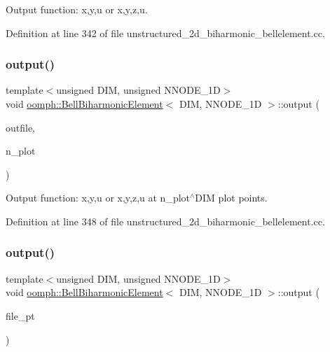 Output function\+: x,y,u or x,y,z,u. 



Definition at line 342 of file unstructured\+\_\+2d\+\_\+biharmonic\+\_\+bellelement.\+cc.

\mbox{\label{classoomph_1_1BellBiharmonicElement_a558bc65d41a06e864e62eba4d3aa4fa5}} 
\subsubsection{\texorpdfstring{output()}{output()}\hspace{0.1cm}{\footnotesize\ttfamily [2/4]}}
{\footnotesize\ttfamily template$<$unsigned D\+IM, unsigned N\+N\+O\+D\+E\+\_\+1D$>$ \\
void \hyperlink{classoomph_1_1BellBiharmonicElement}{oomph\+::\+Bell\+Biharmonic\+Element}$<$ D\+IM, N\+N\+O\+D\+E\+\_\+1D $>$\+::output (\begin{DoxyParamCaption}\item[{std\+::ostream \&}]{outfile,  }\item[{const unsigned \&}]{n\+\_\+plot }\end{DoxyParamCaption})\hspace{0.3cm}{\ttfamily [inline]}}



Output function\+: x,y,u or x,y,z,u at n\+\_\+plot$^\wedge$\+D\+IM plot points. 



Definition at line 348 of file unstructured\+\_\+2d\+\_\+biharmonic\+\_\+bellelement.\+cc.

\mbox{\label{classoomph_1_1BellBiharmonicElement_a438ad259cc2614b7987542126d92d015}} 
\subsubsection{\texorpdfstring{output()}{output()}\hspace{0.1cm}{\footnotesize\ttfamily [3/4]}}
{\footnotesize\ttfamily template$<$unsigned D\+IM, unsigned N\+N\+O\+D\+E\+\_\+1D$>$ \\
void \hyperlink{classoomph_1_1BellBiharmonicElement}{oomph\+::\+Bell\+Biharmonic\+Element}$<$ D\+IM, N\+N\+O\+D\+E\+\_\+1D $>$\+::output (\begin{DoxyParamCaption}\item[{F\+I\+LE $\ast$}]{file\+\_\+pt }\end{DoxyParamCaption})\hspace{0.3cm}{\ttfamily [inline]}}



